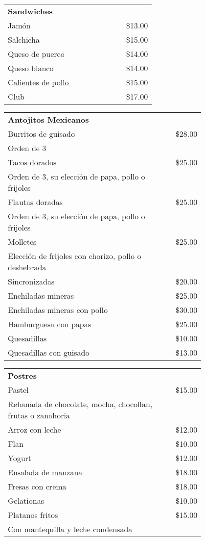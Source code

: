 \documentclass[12pt]{article}
\makeatletter
\newenvironment{Group}[1]
  {\noindent\begin{tabular*}{\textwidth}{@{}p{0.8\linewidth}@{\extracolsep{\fill}}r@{}}
    {\bfseries\large{#1}}\\[0.35em]}
  {\end{tabular*}}
\newcommand*\Entry[2]{%
  \sffamily#1 & #2}
\newcommand*\Expl[1]{%
  \hspace*{1em}\footnotesize #1}
\makeatother
\begin{document}
\begin{Group}{Sandwiches}
\Entry{Jamón}{\$13.00}\\
\Entry{Salchicha}{\$15.00}\\
\Entry{Queso de puerco}{\$14.00}\\
\Entry{Queso blanco}{\$14.00}\\
\Entry{Calientes de pollo}{\$15.00}\\
\Entry{Club}{\$17.00}
\end{Group}\vspace{10pt}

\begin{Group}{Antojitos Mexicanos}
\Entry{Burritos de guisado}{\$28.00}\\
\Expl{Orden de 3}\\
\Entry{Tacos dorados}{\$25.00}\\
\Expl{Orden de‭ ‬3‭, su elección de papa, pollo o frijoles}\\
\Entry{Flautas doradas}{\$25.00}\\
\Expl{Orden de‭ ‬3‭, su elección de papa, pollo o frijoles}\\
\Entry{Molletes}{\$25.00}\\
\Expl{Elección de frijoles con chorizo, pollo o deshebrada}\\
\Entry{Sincronizadas}{\$20.00}\\
\Entry{Enchiladas mineras}{\$25.00}\\
\Entry{Enchiladas mineras con pollo}{\$30.00}\\
\Entry{Hamburguesa con papas}{\$25.00}\\
\Entry{Quesadillas}{\$10.00}\\
\Entry{Quesadillas con guisado}{\$13.00}\\
\end{Group}\vspace{10pt}

\begin{Group}{Postres}
\Entry{Pastel}{\$15.00}\\
\Expl{Rebanada de chocolate, mocha, chocoflan, frutas o zanahoria}\\
\Entry{Arroz con leche}{\$12.00}\\
\Entry{Flan}{\$10.00}\\
\Entry{Yogurt}{\$12.00}\\
\Entry{Ensalada de manzana}{\$18.00}\\
\Entry{Fresas con crema}{\$18.00}\\
\Entry{Gelationas}{\$10.00}\\
\Entry{Platanos fritos}{\$15.00}\\
\Expl{Con mantequilla y leche condensada}
\end{Group}\vspace{10pt}
\end{document}
